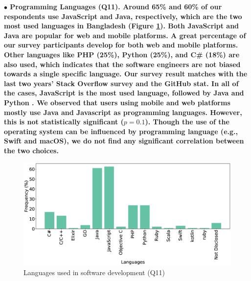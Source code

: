 \nd\bf{$\bullet$ Programming Languages (Q11).} Around 65\% and 60\% of our respondents use JavaScript and
Java, respectively, which are the two most used languages in Bangladesh (Figure
\ref{fig:languages}). Both JavaScript and Java are popular for web and mobile
platforms. A great percentage of our survey participants develop for both
web and mobile platforms. Other languages
like PHP (25\%), Python (25\%), and C\# (18\%) are also used, which indicates
that the software engineers are not biased towards a single specific language.
Our survey result matches with the last two years' Stack Overflow survey and the
GitHub stat. In all of the cases, JavaScript is the most used language, followed
by Java and Python \citep{StackoverflowSurvey2020, StackoverflowSurvey2019,
GithubStat}. We
observed that users using mobile and web platforms mostly use Java and
Javascript as programming languages. However, this is not statistically
significant ($p=0.1$). Though the use of the operating system can be influenced by
programming language (e.g., Swift and macOS), we do not find any significant correlation
between the two choices.
\begin{figure}[t]
\centering
  \includegraphics[scale=0.18]{Figures/Respondents_languages}
  \caption{Languages used in software development (Q11)}
  \label{fig:languages}
\end{figure}


